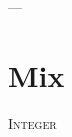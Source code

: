 
\begin{savequote}[85mm]
          {\color{stdgrey}---}
      
\end{savequote}
      
\chapter{Mix}
\label{chap:Mix}
      
 \lettrine[lines=4,findent=5pt]{\textcolor{stdgrey}{I}}{nteger} 
      


%   

